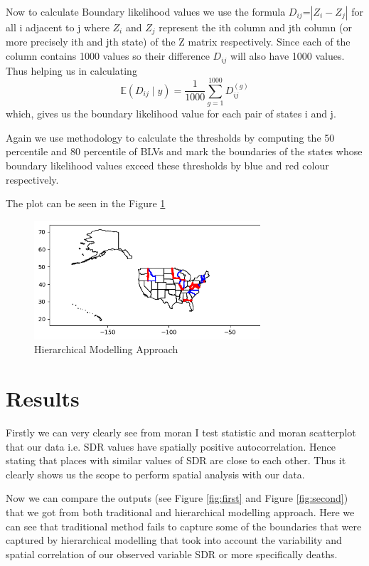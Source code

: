\documentclass[enabledeprecatedfontcommands,parskip=half,twoside=semi,BCOR=0mm]{scrreprt}
\numberwithin{equation}{chapter}
\theoremstyle{definition}
\theoremstyle{remark}
\begin{document}
    Now to calculate Boundary likelihood values we use the formula
    \(D_{ij}\)=\(|Z_i-Z_j|\) for all i adjacent to j where \(Z_i\) and \(Z_j\) represent the ith column and jth column (or more precisely ith and jth state) of the Z matrix respectively. Since each of the column contains 1000 values so their difference \(D_{ij}\) will also have 1000 values. Thus helping us in calculating 
    \[
    \mathbb{E}(D_{ij} \mid y) = \frac{1}{1000} \sum_{g=1}^{1000} D_{ij}^{(g)}
    \]
    which, gives us the boundary likelihood value for each pair of states i and j.
    
    Again we use \cite{Lu_Carlin.2005} methodology to calculate the thresholds by computing the 50 percentile and 80 percentile of BLVs and mark the boundaries of the states whose boundary likelihood values exceed these thresholds by blue and red colour respectively.

    The plot can be seen in the Figure \ref{fig:Figure 7}
    \begin{figure}[h]
    \centering
    \includegraphics[width=0.75\textwidth]{Hierarchical.png}
    \caption{Hierarchical Modelling Approach}
    \label{fig:Figure 7}
    \end{figure}

    \chapter{Results}
    Firstly we can very clearly see from moran I test statistic and moran scatterplot that our data i.e. SDR values have spatially positive autocorrelation. Hence stating that places with similar values of SDR are close to each other. Thus it clearly shows us the scope to perform spatial analysis with our data. 
    
    Now we can compare the outputs (see Figure \ref{fig:first} and Figure \ref{fig:second}) that we got from both traditional and hierarchical modelling approach. Here we can see that traditional method fails to capture some of the boundaries that were captured by hierarchical modelling that took into account the variability and spatial correlation of our observed variable SDR or more specifically deaths.
   
\end{document}

